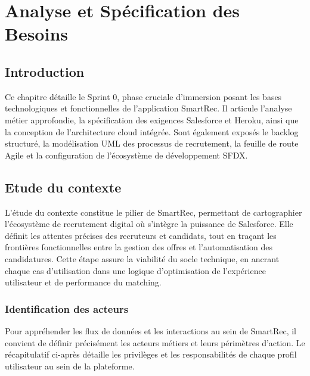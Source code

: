  \chapter{Analyse et Spécification des Besoins}
\renewcommand{\mtctitle}{Sommaire}
\minitoc
	\newpage
 \section*{Introduction}
Ce chapitre détaille le Sprint 0, phase cruciale d'immersion posant les bases technologiques et fonctionnelles de l'application SmartRec. Il articule l'analyse métier approfondie, la spécification des exigences Salesforce et Heroku, ainsi que la conception de l'architecture cloud intégrée. Sont également exposés le backlog structuré, la modélisation UML des processus de recrutement, la feuille de route Agile et la configuration de l'écosystème de développement SFDX.

\section{Etude du contexte}

L'étude du contexte constitue le pilier de SmartRec, permettant de cartographier l'écosystème de recrutement digital où s'intègre la puissance de Salesforce. Elle définit les attentes précises des recruteurs et candidats, tout en traçant les frontières fonctionnelles entre la gestion des offres et l'automatisation des candidatures. Cette étape assure la viabilité du socle technique, en ancrant chaque cas d'utilisation dans une logique d'optimisation de l'expérience utilisateur et de performance du matching.

\subsection{Identification des acteurs}
Pour appréhender les flux de données et les interactions au sein de SmartRec, il convient de définir précisément les acteurs métiers et leurs périmètres d'action. Le récapitulatif ci-après détaille les privilèges et les responsabilités de chaque profil utilisateur au sein de la plateforme.

